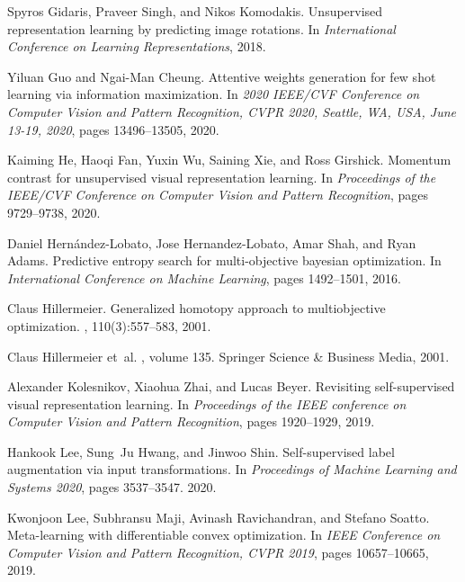 \documentclass[final]{cvpr}
\begin{document}
\begin{thebibliography}{10}
	Spyros Gidaris, Praveer Singh, and Nikos Komodakis.
	\newblock Unsupervised representation learning by predicting image rotations.
	\newblock In {\em International Conference on Learning Representations}, 2018.
	
	Yiluan Guo and Ngai{-}Man Cheung.
	\newblock Attentive weights generation for few shot learning via information
	maximization.
	\newblock In {\em 2020 {IEEE/CVF} Conference on Computer Vision and Pattern
		Recognition, {CVPR} 2020, Seattle, WA, USA, June 13-19, 2020}, pages
	13496--13505, 2020.
	
	Kaiming He, Haoqi Fan, Yuxin Wu, Saining Xie, and Ross Girshick.
	\newblock Momentum contrast for unsupervised visual representation learning.
	\newblock In {\em Proceedings of the IEEE/CVF Conference on Computer Vision and
		Pattern Recognition}, pages 9729--9738, 2020.
	
	Daniel Hern{\'a}ndez-Lobato, Jose Hernandez-Lobato, Amar Shah, and Ryan Adams.
	\newblock Predictive entropy search for multi-objective bayesian optimization.
	\newblock In {\em International Conference on Machine Learning}, pages
	1492--1501, 2016.
	
	Claus Hillermeier.
	\newblock Generalized homotopy approach to multiobjective optimization.
	,
	110(3):557--583, 2001.
	
	Claus Hillermeier et~al.
	, volume 135.
	\newblock Springer Science \& Business Media, 2001.
	
	Alexander Kolesnikov, Xiaohua Zhai, and Lucas Beyer.
	\newblock Revisiting self-supervised visual representation learning.
	\newblock In {\em Proceedings of the IEEE conference on Computer Vision and
		Pattern Recognition}, pages 1920--1929, 2019.
	
	Hankook Lee, Sung~Ju Hwang, and Jinwoo Shin.
	\newblock Self-supervised label augmentation via input transformations.
	\newblock In {\em Proceedings of Machine Learning and Systems 2020}, pages
	3537--3547. 2020.
	
	Kwonjoon Lee, Subhransu Maji, Avinash Ravichandran, and Stefano Soatto.
	\newblock Meta-learning with differentiable convex optimization.
	\newblock In {\em {IEEE} Conference on Computer Vision and Pattern Recognition,
		{CVPR} 2019}, pages 10657--10665, 2019.
	

\end{thebibliography}
\end{document}
